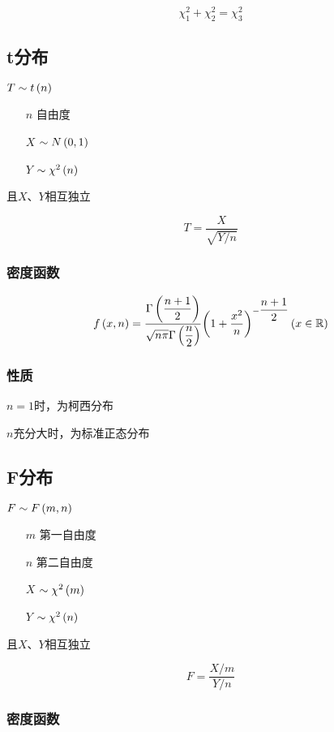 \documentclass{article}
\begin{document}
\[\chi_1^2+\chi_2^2=\chi_3^2\]

\subsection{t分布}

$T\sim t\left(n\right)$

\begin{enumerate}
    \item [$n$] 自由度
    \item [$X$] $\sim N\left(0,1\right)$
    \item [$Y$] $\sim\chi^2\left(n\right)$
\end{enumerate}

且$X$、$Y$相互独立

\[T=\frac{X}{\sqrt{Y/n}}\]

\subsubsection{密度函数}

\[f\left(x,n\right)=\frac{\Gamma\left(\dfrac{n+1}2\right)}{\sqrt{n\pi}\Gamma\left(\dfrac n2\right)}{\left(1+\frac{x^2}n\right)}^{-\dfrac{n+1}2}\left(x\in\mathbb R\right)\]

\subsubsection{性质}

$n=1$时，为柯西分布

$n$充分大时，为标准正态分布

\subsection{F分布}

$F\sim F\left(m,n\right)$

\begin{enumerate}
    \item [$m$] 第一自由度
    \item [$n$] 第二自由度
    \item [$X$] $\sim\chi^2\left(m\right)$
    \item [$Y$] $\sim\chi^2\left(n\right)$
\end{enumerate}

且$X$、$Y$相互独立

\[F=\frac{X/m}{Y/n}\]

\subsubsection{密度函数}
\end{document}
